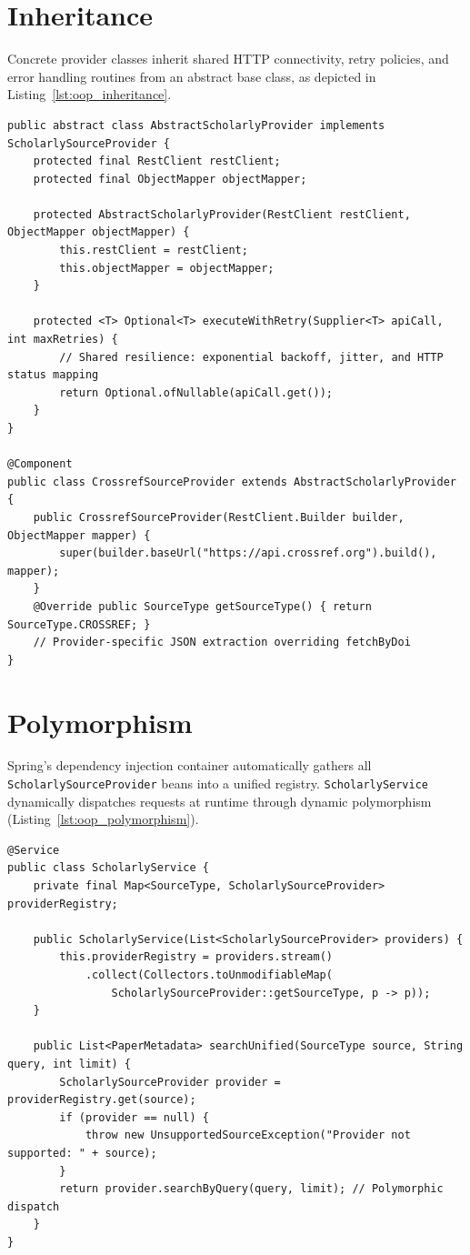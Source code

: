 \documentclass[11pt,a4paper,titlepage]{report}
\begin{document}
\section{Inheritance}
Concrete provider classes inherit shared HTTP connectivity, retry policies, and error handling routines from an abstract base class, as depicted in Listing~\ref{lst:oop_inheritance}.

\begin{lstlisting}[caption={Inheritance in AbstractScholarlyProvider and Crossref Implementation}, label={lst:oop_inheritance}]
public abstract class AbstractScholarlyProvider implements ScholarlySourceProvider {
    protected final RestClient restClient;
    protected final ObjectMapper objectMapper;

    protected AbstractScholarlyProvider(RestClient restClient, ObjectMapper objectMapper) {
        this.restClient = restClient;
        this.objectMapper = objectMapper;
    }

    protected <T> Optional<T> executeWithRetry(Supplier<T> apiCall, int maxRetries) {
        // Shared resilience: exponential backoff, jitter, and HTTP status mapping
        return Optional.ofNullable(apiCall.get());
    }
}

@Component
public class CrossrefSourceProvider extends AbstractScholarlyProvider {
    public CrossrefSourceProvider(RestClient.Builder builder, ObjectMapper mapper) {
        super(builder.baseUrl("https://api.crossref.org").build(), mapper);
    }
    @Override public SourceType getSourceType() { return SourceType.CROSSREF; }
    // Provider-specific JSON extraction overriding fetchByDoi
}
\end{lstlisting}

\section{Polymorphism}
Spring's dependency injection container automatically gathers all \texttt{ScholarlySourceProvider} beans into a unified registry. \texttt{ScholarlyService} dynamically dispatches requests at runtime through dynamic polymorphism (Listing~\ref{lst:oop_polymorphism}).

\begin{lstlisting}[caption={Polymorphic Provider Registry and Dynamic Dispatch}, label={lst:oop_polymorphism}]
@Service
public class ScholarlyService {
    private final Map<SourceType, ScholarlySourceProvider> providerRegistry;

    public ScholarlyService(List<ScholarlySourceProvider> providers) {
        this.providerRegistry = providers.stream()
            .collect(Collectors.toUnmodifiableMap(
                ScholarlySourceProvider::getSourceType, p -> p));
    }

    public List<PaperMetadata> searchUnified(SourceType source, String query, int limit) {
        ScholarlySourceProvider provider = providerRegistry.get(source);
        if (provider == null) {
            throw new UnsupportedSourceException("Provider not supported: " + source);
        }
        return provider.searchByQuery(query, limit); // Polymorphic dispatch
    }
}
\end{lstlisting}
\end{document}
